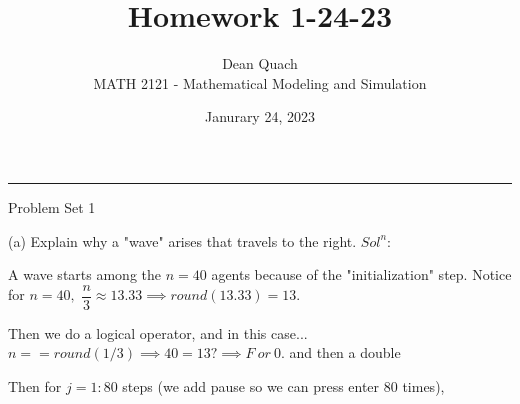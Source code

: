 \documentclass[12pt]{article}
\begin{document}
 
 
 
\title{Homework 1-24-23}%
\author{Dean Quach\\ %
MATH 2121 - Mathematical Modeling and Simulation} %
\date{Janurary 24, 2023}
\maketitle

\hrule
\vspace{20pt}



Problem Set 1

(a) Explain why a "wave" arises that travels to the right.
$Sol^n:$

A wave starts among the $n=40$ agents because of the "initialization" step. 
Notice for $n=40,$ 
$\dfrac{n}{3}\approx 13.33 \implies round(13.33)=13.$

Then we do a logical operator, and in this case...
$n==round(1/3)\implies40=13?\implies F ~or~0$.
and then a double

Then for $j=1:80$ steps (we add pause so we can press enter 80 times),
%

\end{document}

